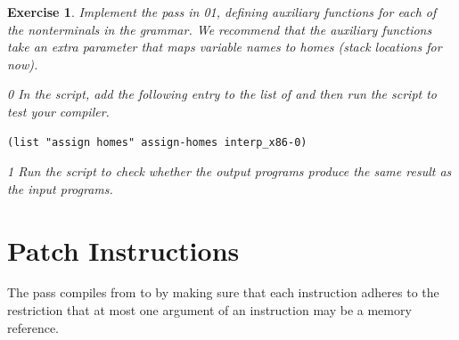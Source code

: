 \documentclass[7x10]{TimesAPriori_MIT}%
\def\racketEd{0}
\def\pythonEd{1}
\def\edition{1}
\newcommand{\racket}[1]{{\if\edition\racketEd{#1}\fi}}
\newcommand{\pythonColor}[0]{}
\newcommand{\python}[1]{{\if\edition\pythonEd\pythonColor #1\fi}}
\newtheorem{exercise}[theorem]{Exercise}
\numberwithin{theorem}{chapter}
\numberwithin{definition}{chapter}
\numberwithin{equation}{chapter}
\begin{document}

\begin{exercise}\normalfont\normalsize
Implement the  pass in
\racket{}\python{}, defining
auxiliary functions for each of the nonterminals in the \LangXVar{}
grammar.  We recommend that the auxiliary functions take an extra
parameter that maps variable names to homes (stack locations for now).
%
{\if\edition\racketEd
In the  script, add the following entry to the
list of  and then run the script to test your compiler.
\begin{lstlisting}
(list "assign homes" assign-homes interp_x86-0)
\end{lstlisting}
\fi}
{\if\edition\pythonEd\pythonColor
Run the  script to check
whether the output programs produce the same result as the input
programs.
\fi}
\end{exercise}


\section{Patch Instructions}
\label{sec:patch-s0}

The  pass compiles from \LangXVar{} to
\LangXInt{} by making sure that each instruction adheres to the
restriction that at most one argument of an instruction may be a
memory reference. 
\end{document}
